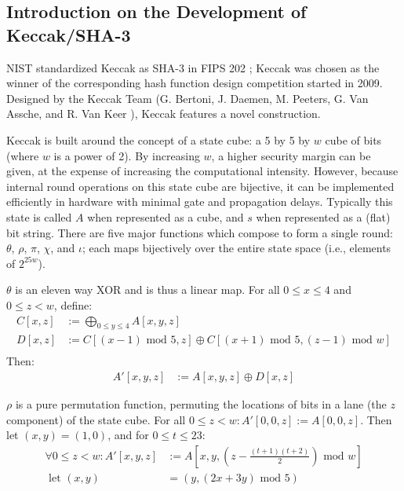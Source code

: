 \documentclass[10pt,twocolumn,twoside]{pnas-new}
\begin{document}
\subsection{Introduction on the Development of Keccak/SHA-3} \label{sec:i:keccak}

    NIST standardized Keccak as SHA-3 in FIPS 202 \cite{NIST202}; Keccak was
chosen as the winner of the corresponding hash function design competition
started in 2009. Designed by the Keccak Team (G. Bertoni, J. Daemen, M.
Peeters, G. Van Assche, and R. Van Keer \cite{KeccakTeam}), Keccak features a
novel construction.

    Keccak is built around the concept of a state cube: a 5 by 5 by $w$ cube
of bits (where $w$ is a power of 2). By increasing $w$, a higher security
margin can be given, at the expense of increasing the computational intensity.
However, because internal round operations on this state cube are bijective,
it can be implemented efficiently in hardware with minimal gate and propagation
delays. Typically this state is called $A$ when represented as a cube, and $s$
when represented as a (flat) bit string. There are five major functions which
compose to form a single round: $\theta$, $\rho$, $\pi$, $\chi$, and $\iota$;
each maps bijectively over the entire state space (i.e., elements of
$2^{25w}$).

    $\theta$ is an eleven way XOR and is thus a linear map. For all
$0 \leq x \leq 4$ and $0 \leq z < w$, define:
\begin{align*}
    C[x, z] & := \bigoplus_{0 \leq y \leq 4} A[x, y, z] \\
    D[x, z] & := C[(x-1) \text{ mod } 5, z] \oplus C[(x+1) \text{ mod } 5, (z - 1) \text{ mod } w] \\
\end{align*}
Then:
\begin{align*}
    A'[x, y, z] & := A[x, y, z] \oplus D[x, z]
\end{align*}

    $\rho$ is a pure permutation function, permuting the locations of bits in
a lane (the $z$ component) of the state cube. For all
$0 \leq z < w: A'[0, 0, z] := A[0, 0, z]$. Then let $(x, y) = (1, 0)$, and for
$0 \leq t \leq 23$:
\begin{align*}
    \forall 0 \leq z < w: A'[x, y, z] & := A[x, y, (z - \frac{(t+1)(t+2)}{2}) \text{ mod } w] \\
    \text{ let } (x, y) & = (y, (2x + 3y) \text{ mod } 5)
\end{align*}
\end{document}
